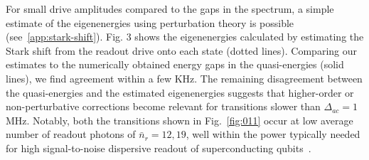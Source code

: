 \documentclass[%
reprint,
superscriptaddress,
 amsmath,amssymb,
 aps,
 prx,
longbibliography,
floatfix,
]{revtex4-2}
\begin{document}
For small drive amplitudes compared to the gaps in the spectrum, a simple estimate of the eigenenergies using perturbation theory is possible (see~\ref{app:stark-shift}). Fig. 3 shows the eigenenergies calculated by estimating the Stark shift from the readout drive onto each state (dotted lines). Comparing our estimates to the numerically obtained energy gaps in the quasi-energies (solid lines), we find agreement within a few KHz. The remaining disagreement between the quasi-energies and the estimated eigenenergies suggests that higher-order or non-perturbative corrections become relevant for transitions slower than $\Delta_{ac}=1$ MHz. Notably, both the transitions shown in Fig.~\ref{fig:011} occur at low average number of readout photons of $\bar n_r=12,19$, well within the power typically needed for high signal-to-noise dispersive readout of superconducting qubits~\cite{gusenkova2021quantum}.
\end{document}
